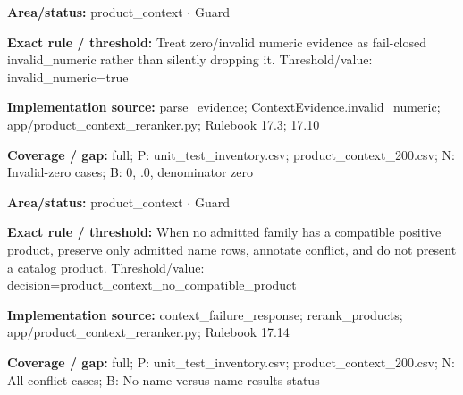 \begin{tcolorbox}[enhanced,breakable,colback=white,colframe=Muted!45,boxrule=0.45pt,arc=1.5pt,left=6pt,right=6pt,top=5pt,bottom=5pt,title={\texttt{PC-INVALID-ZERO-04}},title after break={\texttt{PC-INVALID-ZERO-04}\ (continued)},fonttitle=\headingfont\bfseries\color{Navy},coltitle=Navy]
\textbf{Area/status:} product\_\allowbreak{}context $\boldsymbol{\cdot}$ Guard\par
\smallskip
\textbf{Exact rule / threshold:} Treat zero/\allowbreak{}invalid numeric evidence as fail-closed invalid\_\allowbreak{}numeric rather than silently dropping it. Threshold/\allowbreak{}value: invalid\_\allowbreak{}numeric=true\par
\smallskip
\textbf{Implementation source:} parse\_\allowbreak{}evidence; ContextEvidence.invalid\_\allowbreak{}numeric; app/\allowbreak{}product\_\allowbreak{}context\_\allowbreak{}reranker.py; Rulebook 17.3; 17.10\par
\smallskip
\textbf{Coverage / gap:} full; P: unit\_\allowbreak{}test\_\allowbreak{}inventory.csv; product\_\allowbreak{}context\_\allowbreak{}200.csv; N: Invalid-zero cases; B: 0, .0, denominator zero
\end{tcolorbox}
\begin{tcolorbox}[enhanced,breakable,colback=white,colframe=Muted!45,boxrule=0.45pt,arc=1.5pt,left=6pt,right=6pt,top=5pt,bottom=5pt,title={\texttt{PC-NO-COMPATIBLE-19}},title after break={\texttt{PC-NO-COMPATIBLE-19}\ (continued)},fonttitle=\headingfont\bfseries\color{Navy},coltitle=Navy]
\textbf{Area/status:} product\_\allowbreak{}context $\boldsymbol{\cdot}$ Guard\par
\smallskip
\textbf{Exact rule / threshold:} When no admitted family has a compatible positive product, preserve only admitted name rows, annotate conflict, and do not present a catalog product. Threshold/\allowbreak{}value: decision=product\_\allowbreak{}context\_\allowbreak{}no\_\allowbreak{}compatible\_\allowbreak{}product\par
\smallskip
\textbf{Implementation source:} context\_\allowbreak{}failure\_\allowbreak{}response; rerank\_\allowbreak{}products; app/\allowbreak{}product\_\allowbreak{}context\_\allowbreak{}reranker.py; Rulebook 17.14\par
\smallskip
\textbf{Coverage / gap:} full; P: unit\_\allowbreak{}test\_\allowbreak{}inventory.csv; product\_\allowbreak{}context\_\allowbreak{}200.csv; N: All-conflict cases; B: No-name versus name-results status
\end{tcolorbox}
